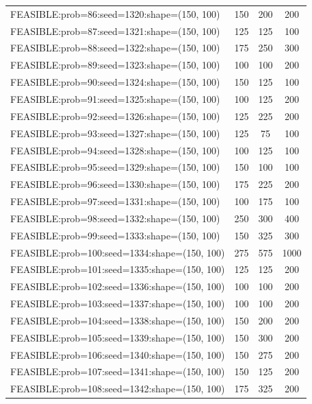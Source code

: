 \begin{longtable}{lccc}
FEASIBLE:prob=86:seed=1320:shape=(150, 100)  &      150 &   200 &    200 \\
FEASIBLE:prob=87:seed=1321:shape=(150, 100)  &      125 &   125 &    100 \\
FEASIBLE:prob=88:seed=1322:shape=(150, 100)  &      175 &   250 &    300 \\
FEASIBLE:prob=89:seed=1323:shape=(150, 100)  &      100 &   100 &    200 \\
FEASIBLE:prob=90:seed=1324:shape=(150, 100)  &      150 &   125 &    100 \\
FEASIBLE:prob=91:seed=1325:shape=(150, 100)  &      100 &   125 &    200 \\
FEASIBLE:prob=92:seed=1326:shape=(150, 100)  &      125 &   225 &    200 \\
FEASIBLE:prob=93:seed=1327:shape=(150, 100)  &      125 &    75 &    100 \\
FEASIBLE:prob=94:seed=1328:shape=(150, 100)  &      100 &   125 &    100 \\
FEASIBLE:prob=95:seed=1329:shape=(150, 100)  &      150 &   100 &    100 \\
FEASIBLE:prob=96:seed=1330:shape=(150, 100)  &      175 &   225 &    200 \\
FEASIBLE:prob=97:seed=1331:shape=(150, 100)  &      100 &   175 &    100 \\
FEASIBLE:prob=98:seed=1332:shape=(150, 100)  &      250 &   300 &    400 \\
FEASIBLE:prob=99:seed=1333:shape=(150, 100)  &      150 &   325 &    300 \\
FEASIBLE:prob=100:seed=1334:shape=(150, 100) &      275 &   575 &   1000 \\
FEASIBLE:prob=101:seed=1335:shape=(150, 100) &      125 &   125 &    200 \\
FEASIBLE:prob=102:seed=1336:shape=(150, 100) &      100 &   100 &    200 \\
FEASIBLE:prob=103:seed=1337:shape=(150, 100) &      100 &   100 &    200 \\
FEASIBLE:prob=104:seed=1338:shape=(150, 100) &      150 &   200 &    200 \\
FEASIBLE:prob=105:seed=1339:shape=(150, 100) &      150 &   300 &    200 \\
FEASIBLE:prob=106:seed=1340:shape=(150, 100) &      150 &   275 &    200 \\
FEASIBLE:prob=107:seed=1341:shape=(150, 100) &      150 &   125 &    200 \\
FEASIBLE:prob=108:seed=1342:shape=(150, 100) &      175 &   325 &    200 \\

\end{longtable}
